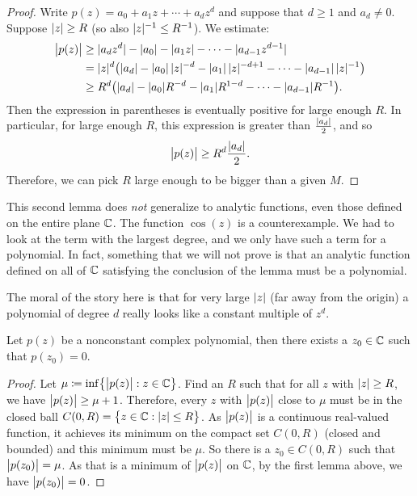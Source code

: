 \begin{proof}
Write $p(z) = a_0 + a_1 z + \cdots + a_d z^d$ and suppose that $d \geq 1$
and $a_d \neq 0$.
Suppose $\lvert {z} \rvert \geq R$ (so also $\lvert {z} \rvert^{-1} \leq R^{-1}$).
We estimate:
\begin{equation*}
\begin{split}
\bigl\lvert {p(z)} \bigr\rvert
& \geq
\lvert {a_d z^d} \rvert -
\lvert {a_0} \rvert - \lvert {a_1 z} \rvert - \cdots - \lvert {a_{d-1} z^{d-1} } \rvert
\\
& =
\lvert {z} \rvert^d \bigl(
\lvert {a_d} \rvert -
\lvert {a_0} \rvert \, \lvert {z} \rvert^{-d} -
\lvert {a_1} \rvert \, \lvert {z} \rvert^{-d+1} - \cdots - \lvert {a_{d-1}} \rvert \, \lvert {z} \rvert^{-1}
\bigr)
\\
& \geq
R^d \bigl(\lvert {a_d} \rvert -
\lvert {a_0} \rvert R^{-d} - \lvert {a_1} \rvert R^{1-d} - \cdots - \lvert {a_{d-1}} \rvert R^{-1} \bigr)
.
\end{split}
\end{equation*}
Then the expression in parentheses is eventually positive for large enough
$R$.  In particular, for large enough $R$, this expression
is greater than
$\frac{\lvert {a_d} \rvert}{2}$, and so
\begin{equation*}
\bigl\lvert {p(z)} \bigr\rvert
\geq
R^d \frac{\lvert {a_d} \rvert}{2} .
\end{equation*}
Therefore,
we can pick $R$ large enough to be bigger than a given $M$.
\end{proof}

This second lemma does \emph{not} generalize to analytic
functions, even those defined on the entire plane ${\mathbb{C}}$.  The function
$\cos(z)$ is a counterexample.
We had to look
at the term with the largest degree, and we only have such a term for
a polynomial.  In fact, something that we will not prove is that
an analytic function defined on all of ${\mathbb{C}}$ satisfying the conclusion
of the lemma must be a polynomial.

The moral of the story here is that for very large $\lvert {z} \rvert$ (far away from
the origin) a polynomial of degree $d$ really looks like a constant multiple
of $z^d$.

\begin{thm}
%
Let $p(z)$ be a nonconstant complex polynomial, then there exists a $z_0 \in {\mathbb{C}}$
such that $p(z_0) = 0$.
\end{thm}

\begin{proof}
Let $\mu \coloneqq \inf \bigl\{ \bigl\lvert {p(z)} \bigr\rvert : z \in {\mathbb{C}} \bigr\}$.  Find an $R$ such that
for all $z$ with $\lvert {z} \rvert \geq R$, we have $\bigl\lvert {p(z)} \bigr\rvert \geq \mu+1$.
Therefore, every $z$ with $\bigl\lvert {p(z)} \bigr\rvert$ close to $\mu$ must be in the
closed ball $C(0,R) = \bigl\{ z \in {\mathbb{C}} : \lvert {z} \rvert \leq R \bigr\}$.  As $\bigl\lvert {p(z)} \bigr\rvert$
is a continuous real-valued function, it achieves its minimum
on the compact set $C(0,R)$ (closed and bounded) and this minimum must
be $\mu$.  So there is a $z_0 \in C(0,R)$ such that $\bigl\lvert {p(z_0)} \bigr\rvert = \mu$.
As that is a minimum of $\bigl\lvert {p(z)} \bigr\rvert$ on ${\mathbb{C}}$, by the first lemma
above, we have $\bigl\lvert {p(z_0)} \bigr\rvert = 0$.
\end{proof}

